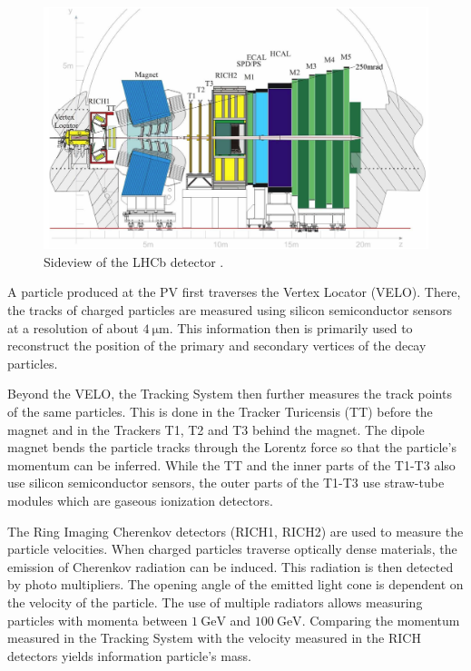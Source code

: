 \begin{figure}
    \centering
    \includegraphics[width=\textwidth]{images/lhcb_detector.png}
    \caption{Sideview of the LHCb detector \cite{LHCb}. }
    \label{fig:lhcb_detector}
\end{figure}

A particle produced at the PV first traverses the Vertex Locator (VELO). 
There, the tracks of charged particles are measured using silicon semiconductor sensors at a resolution of about $\qty{4}{\micro\meter}$. 
This information then is primarily used to reconstruct the position of the primary and secondary vertices of the decay particles.

Beyond the VELO, the Tracking System then further measures the track points of the same particles. 
This is done in the Tracker Turicensis (TT) before the magnet and in the Trackers T1, T2 and T3 behind the magnet.
The dipole magnet bends the particle tracks through the Lorentz force so that the particle's momentum can be inferred.
While the TT and the inner parts of the T1-T3 also use silicon semiconductor sensors, the outer parts of the T1-T3 use straw-tube modules which are gaseous ionization detectors. 

The Ring Imaging Cherenkov detectors (RICH1, RICH2) are used to measure the particle velocities.
When charged particles traverse optically dense materials, the emission of Cherenkov radiation can be induced.
This radiation is then detected by photo multipliers. 
The opening angle of the emitted light cone is dependent on the velocity of the particle. 
The use of multiple radiators allows measuring particles with momenta between $\qty{1}{\GeV}$ and $\qty{100}{\GeV}$.
Comparing the momentum measured in the Tracking System with the velocity measured in the RICH detectors yields information particle's mass. 

